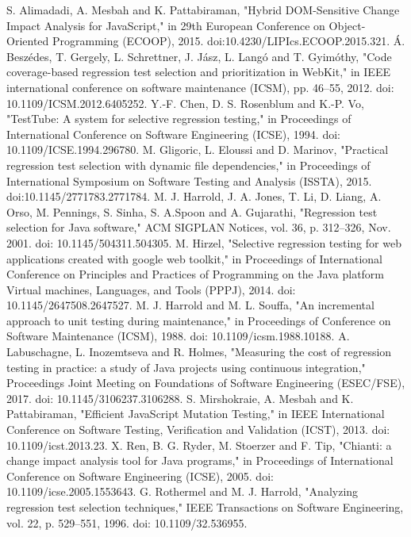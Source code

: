 \documentclass[10pt, conference]{IEEEtran}
\begin{document}
\balance
\begin{thebibliography}{00}
 S. Alimadadi, A. Mesbah and K. Pattabiraman, "Hybrid DOM-Sensitive Change Impact Analysis for JavaScript," in 29th European Conference on Object-Oriented Programming (ECOOP), 2015. doi:10.4230/LIPIcs.ECOOP.2015.321.
 Á. Beszédes, T. Gergely, L. Schrettner, J. Jász, L. Langó and T. Gyimóthy, "Code coverage-based regression test selection and prioritization in WebKit," in IEEE international conference on software maintenance (ICSM), pp. 46–55, 2012. doi: 10.1109/ICSM.2012.6405252.
 Y.-F. Chen, D. S. Rosenblum and K.-P. Vo, "TestTube: A system for selective regression testing," in Proceedings of International Conference on Software Engineering (ICSE), 1994. doi: 10.1109/ICSE.1994.296780.
 M. Gligoric, L. Eloussi and D. Marinov, "Practical regression test selection with dynamic file dependencies," in Proceedings of International Symposium on Software Testing and Analysis (ISSTA), 2015. doi:10.1145/2771783.2771784.
 M. J. Harrold, J. A. Jones, T. Li, D. Liang, A. Orso, M. Pennings, S. Sinha, S. A.Spoon and A. Gujarathi, "Regression test selection for Java software," ACM SIGPLAN Notices, vol. 36, p. 312–326, Nov. 2001. doi: 10.1145/504311.504305.
 M. Hirzel, "Selective regression testing for web applications created with google web toolkit," in Proceedings of International Conference on Principles and Practices of Programming on the Java platform Virtual machines, Languages, and Tools (PPPJ), 2014. doi: 10.1145/2647508.2647527.
 M. J. Harrold and M. L. Souffa, "An incremental approach to unit testing during maintenance," in Proceedings of Conference on Software Maintenance (ICSM), 1988. doi: 10.1109/icsm.1988.10188.
 A. Labuschagne, L. Inozemtseva and R. Holmes, "Measuring the cost of regression testing in practice: a study of Java projects using continuous integration," Proceedings Joint Meeting on Foundations of Software Engineering (ESEC/FSE), 2017. doi: 10.1145/3106237.3106288.
 S. Mirshokraie, A. Mesbah and K. Pattabiraman, "Efficient JavaScript Mutation Testing," in IEEE International Conference on Software Testing, Verification and Validation (ICST), 2013. doi: 10.1109/icst.2013.23.
 X. Ren, B. G. Ryder, M. Stoerzer and F. Tip, "Chianti: a change impact analysis tool for Java programs," in Proceedings of International Conference on Software Engineering (ICSE), 2005. doi: 10.1109/icse.2005.1553643.
 G. Rothermel and M. J. Harrold, "Analyzing regression test selection techniques," IEEE Transactions on Software Engineering, vol. 22, p. 529–551, 1996. doi: 10.1109/32.536955.

\end{thebibliography}
\end{document}
